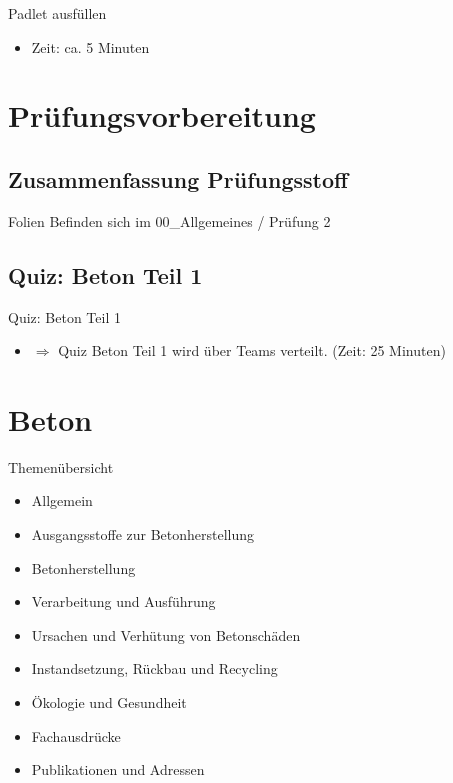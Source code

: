 \begin{frame}{Padlet ausfüllen}

    \begin{itemize}
        \item Zeit: ca. 5 Minuten
    \end{itemize}

\end{frame}

\section{Prüfungsvorbereitung}
\BlueSectionSlide

\subsection{Zusammenfassung Prüfungsstoff}
\begin{frame}{Folien}
    Befinden sich im 00\_Allgemeines / Prüfung 2

\end{frame}

\subsection{Quiz: Beton Teil 1}
\begin{frame}{Quiz: Beton Teil 1}
    \begin{itemize}
        \item[\textbullet] $\Rightarrow$ Quiz Beton Teil 1 wird über Teams verteilt. (Zeit: 25 Minuten)
    \end{itemize}
\end{frame}






\section{Beton}
\BlueSectionSlide

\begin{frame}{Themenübersicht}
    \begin{itemize}
        \item Allgemein
        \item Ausgangsstoffe zur Betonherstellung
        \item Betonherstellung
        \item Verarbeitung und Ausführung
        \item Ursachen und Verhütung von Betonschäden
        \item Instandsetzung, Rückbau und Recycling
        \item Ökologie und Gesundheit
        \item Fachausdrücke
        \item Publikationen und Adressen
    \end{itemize}
\end{frame}

